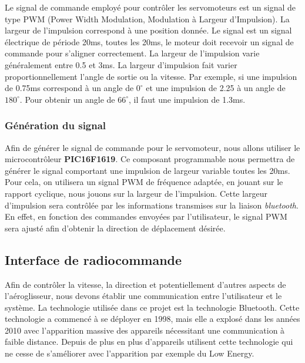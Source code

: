 \documentclass[a4paper,12pt]{report}
\begin{document}
			Le signal de commande employé pour contrôler les servomoteurs est un signal de type PWM (Power Width Modulation, Modulation à Largeur d'Impulsion). La largeur de l'impulsion correspond à une position donnée. Le signal est un signal électrique de période 20ms, toutes les 20ms, le moteur doit recevoir un signal de commande pour s'aligner correctement. La largeur de l'impulsion varie généralement entre 0.5 et 3ms. La largeur d'impulsion fait varier proportionnellement l'angle de sortie ou la vitesse. Par exemple, si une impulsion de 0.75ms correspond à un angle de $0^{\circ}$ et une impulsion de 2.25 à un angle de $180^{\circ}$. Pour obtenir un angle de $66^{\circ}$, il faut une impulsion de 1.3ms.   
			
			\vspace{-1em}
			
			\subsubsection{Génération du signal}
			
			\vspace{-1em}
			
			Afin de générer le signal de commande pour le servomoteur, nous allons utiliser le microcontrôleur \textbf{PIC16F1619}. Ce composant programmable nous permettra de générer le signal comportant une impulsion de largeur variable toutes les 20ms. Pour cela, on utilisera un signal PWM de fréquence adaptée, en jouant sur le rapport cyclique, nous jouons sur la largeur de l'impulsion. Cette largeur d'impulsion sera contrôlée par les informations transmises sur la liaison \textit{bluetooth}. En effet, en fonction des commandes envoyées par l'utilisateur, le signal PWM sera ajusté afin d'obtenir la direction de déplacement désirée.
			
		\vspace{-1em}
			
		\subsection{Interface de radiocommande}
			Afin de contrôler la vitesse, la direction et potentiellement d'autres aspects de l'aéroglisseur, nous devons établir une communication entre l'utilisateur et le système. La technologie utilisée dans ce projet est la technologie Bluetooth. Cette technologie a commencé à se déployer en 1998, mais elle a explosé dans les années 2010 avec l'apparition massive des appareils nécessitant une communication à faible distance. Depuis de plus en plus d'appareils utilisent cette technologie qui ne cesse de s'améliorer avec l'apparition par exemple du Low Energy.
			
\end{document}
